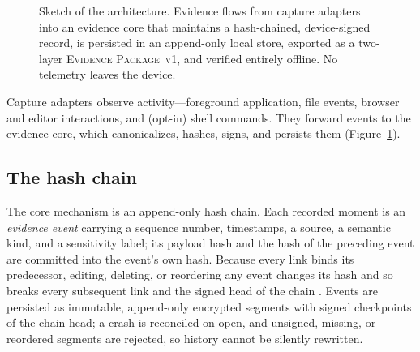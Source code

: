 \documentclass[11pt]{article}
\newcommand{\evpkg}{\textsc{Evidence Package~v1}\xspace}
\begin{document}
\begin{figure}[ht]
\centering
{}
\caption{Sketch of the architecture. Evidence flows from capture adapters into an
evidence core that maintains a hash-chained, device-signed record, is persisted in an
append-only local store, exported as a two-layer \evpkg, and verified entirely offline.
No telemetry leaves the device.}
\label{fig:arch}
\end{figure}

Capture adapters observe activity---foreground application, file events, browser and
editor interactions, and (opt-in) shell commands. They forward events to the evidence
core, which canonicalizes, hashes, signs, and persists them (Figure~\ref{fig:arch}).

\subsection{The hash chain}

The core mechanism is an append-only hash chain. Each recorded moment is an
\emph{evidence event} carrying a sequence number, timestamps, a source, a semantic
kind, and a sensitivity label; its payload hash and the hash of the preceding event are
committed into the event's own hash. Because every link binds its predecessor, editing,
deleting, or reordering any event changes its hash and so breaks every subsequent link
and the signed head of the chain \parencite{crosby2009}. Events are persisted as immutable,
append-only encrypted segments with signed checkpoints of the chain head; a crash is
reconciled on open, and unsigned, missing, or reordered segments are rejected, so
history cannot be silently rewritten.
\end{document}
